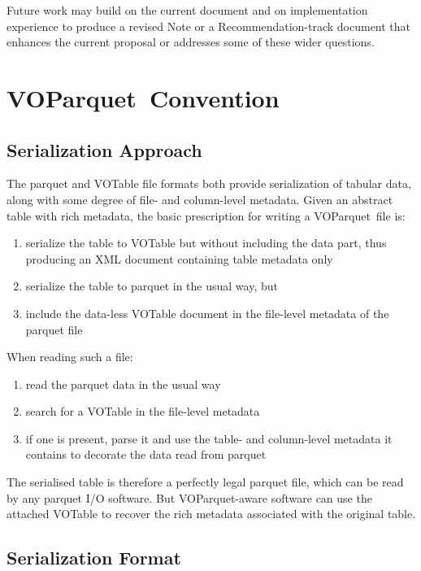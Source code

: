 \documentclass[11pt,a4paper]{ivoa}
\newcommand{\voparquet}{VOParquet}
\begin{document}
Future work may build on the current document and on implementation
experience to produce a revised Note or a Recommendation-track document
that enhances the current proposal or addresses
some of these wider questions.

\section{\voparquet\ Convention}
\label{sec:serialization}

\subsection{Serialization Approach}

The parquet and VOTable file formats both provide serialization
of tabular data, along with some degree of file- and column-level metadata.
Given an abstract table with rich metadata,
the basic prescription for writing a \voparquet\ file is:
\begin{enumerate}
\item serialize the table to VOTable but without including the data part,
      thus producing an XML document containing table metadata only
\item serialize the table to parquet in the usual way, but
\item include the data-less VOTable document in the file-level metadata
      of the parquet file
\end{enumerate}
When reading such a file:
\begin{enumerate}
\item read the parquet data in the usual way
\item search for a VOTable in the file-level metadata
\item if one is present, parse it and use the table- and column-level
      metadata it contains to decorate the data read from parquet
\end{enumerate}

The serialised table is therefore a perfectly legal parquet file,
which can be read by any parquet I/O software.
But \voparquet-aware software can use the attached VOTable to recover
the rich metadata associated with the original table.

\subsection{Serialization Format}
\label{sec:format}
\end{document}

